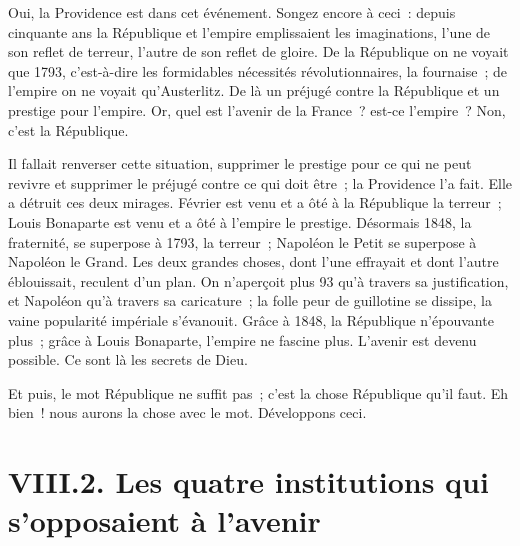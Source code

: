\documentclass[french,twoside]{book} %
\begin{document}
Oui, la Providence est dans cet événement. Songez encore à ceci : depuis cinquante ans la République et l’empire emplissaient les imaginations, l’une de son reflet de terreur, l’autre de son reflet de gloire. De la République on ne voyait que 1793, c’est-à-dire les formidables nécessités révolutionnaires, la fournaise ; de l’empire on ne voyait qu’Austerlitz. De là un préjugé contre la République et un prestige pour l’empire. Or, quel est l’avenir de la France ? est-ce l’empire ? Non, c’est la République.\par
Il fallait renverser cette situation, supprimer le prestige pour ce qui ne peut revivre et supprimer le préjugé contre ce qui doit être ; la Providence l’a fait. Elle a détruit ces deux mirages. Février est venu et a ôté à la République la terreur ; Louis Bonaparte est venu et a ôté à l’empire le prestige. Désormais 1848, la fraternité, se superpose à 1793, la terreur ; Napoléon le Petit se superpose à Napoléon le Grand. Les deux grandes choses, dont l’une effrayait et dont l’autre éblouissait, reculent d’un plan. On n’aperçoit plus 93 qu’à travers sa justification, et Napoléon qu’à travers sa caricature ; la folle peur de guillotine se dissipe, la vaine popularité impériale s’évanouit. Grâce à 1848, la République n’épouvante plus ; grâce à Louis Bonaparte, l’empire ne fascine plus. L’avenir est devenu possible. Ce sont là les secrets de Dieu.\par
Et puis, le mot République ne suffit pas ; c’est la chose République qu’il faut. Eh bien ! nous aurons la chose avec le mot. Développons ceci.

\section[{VIII.2. Les quatre institutions qui s’opposaient à l’avenir}]{VIII.2. Les quatre institutions qui s’opposaient à l’avenir}
\end{document}

